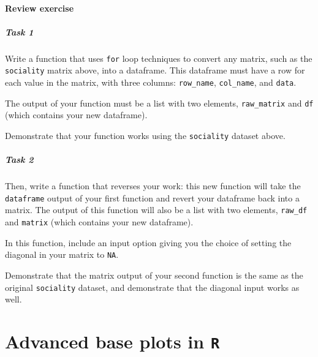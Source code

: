 \documentclass[
]{book}
\begin{document}
\hypertarget{review-exercise-3}{%
\subsubsection*{Review exercise}\label{review-exercise-3}}

\hypertarget{task-1-2}{%
\paragraph{Task 1}\label{task-1-2}}

Write a function that uses \texttt{for} loop techniques to convert any matrix, such as the \texttt{sociality} matrix above, into a dataframe. This dataframe must have a row for each value in the matrix, with three columns: \texttt{row\_name}, \texttt{col\_name}, and \texttt{data}.

The output of your function must be a list with two elements, \texttt{raw\_matrix} and \texttt{df} (which contains your new dataframe).

Demonstrate that your function works using the \texttt{sociality} dataset above.

\hypertarget{task-2-2}{%
\paragraph{Task 2}\label{task-2-2}}

Then, write a function that reverses your work: this new function will take the \texttt{dataframe} output of your first function and revert your dataframe back into a matrix. The output of this function will also be a list with two elements, \texttt{raw\_df} and \texttt{matrix} (which contains your new dataframe).

In this function, include an input option giving you the choice of setting the diagonal in your matrix to \texttt{NA}.

Demonstrate that the matrix output of your second function is the same as the original \texttt{sociality} dataset, and demonstrate that the diagonal input works as well.

\hypertarget{advanced-base-plots-in-r}{%
\chapter{\texorpdfstring{Advanced base plots in \texttt{R}}{Advanced base plots in R}}\label{advanced-base-plots-in-r}}
\end{document}
